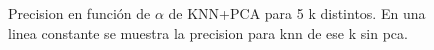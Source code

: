 \begin{figure}[H]
\caption{Precision en función de $\alpha$ de KNN+PCA para 5 k distintos. 
En una linea constante se muestra la precision para knn de ese k sin pca.}
\label{fig:exp5-prec-100}
\end{figure}

\begin{figure}[H]

\end{figure}
